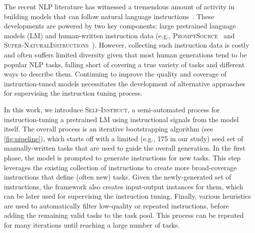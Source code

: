 The recent  NLP literature has witnessed a tremendous amount of activity in building models that can follow natural language instructions~\citep[i.a.]{mishra2022cross,wei2022finetuned,sanh2022multitask,wang2022benchmarking,ouyang2022training,chung2022scaling}.
These developments are powered by two key components: large pretrained language models (LM) and human-written instruction data (e.g., 
\textsc{PromptSource}~\citep{bach2022promptsource} and \textsc{Super-NaturalInstructions}~\citep[\textsc{SuperNI} for short]{wang2022benchmarking}). However, collecting such instruction data is costly and often suffers limited diversity given that most human generations tend to be popular NLP tasks, falling short of covering a true variety of tasks and different ways to describe them. Continuing to improve the quality and coverage of instruction-tuned models necessitates the development of alternative approaches for supervising the instruction tuning process. 

In this work, we introduce \textsc{Self-Instruct}, a semi-automated process for instruction-tuning a pretrained LM using instructional signals from the model itself. The overall process is an iterative bootstrapping algorithm (see \autoref{fig:pipeline}), which starts off with a limited (e.g., 175 in our study) seed set of manually-written tasks that are used to guide the overall generation. In the first phase, the model is prompted to generate instructions for new tasks. This step leverages the existing collection of instructions to create more broad-coverage instructions that define (often new) tasks. Given the newly-generated set of instructions, the framework also creates input-output instances for them, which can be later used for supervising the instruction tuning. Finally, various heuristics are used to automatically filter low-quality or repeated instructions, before adding the remaining valid tasks to the task pool. This process can be repeated for many iterations until reaching a large number of tasks.

